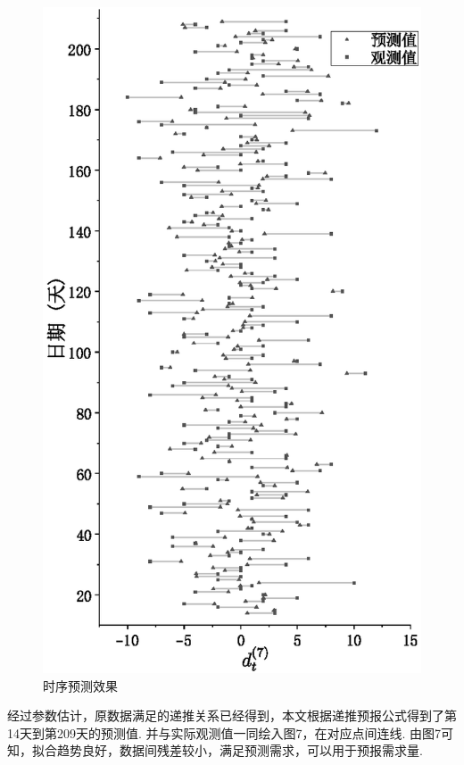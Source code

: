 \begin{figure}[!htbp]
	\centering
	\includegraphics{Image/问题四展示.eps}
	\caption{时序预测效果}\label{时序预测效果}
\end{figure}

经过参数估计，原数据满足的递推关系已经得到，本文根据递推预报公式得到了第14天到第209天的预测值.
并与实际观测值一同绘入图7，在对应点间连线.
由图7可知，拟合趋势良好，数据间残差较小，满足预测需求，可以用于预报需求量.

